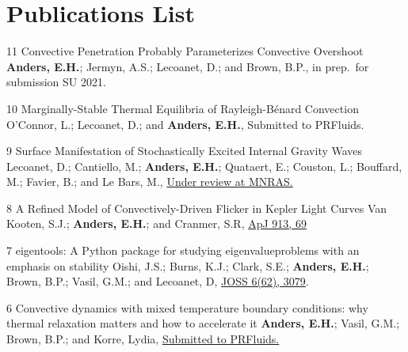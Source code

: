 \section{Publications List}

	  {11}
	  {Convective Penetration Probably Parameterizes Convective Overshoot}
	  {
		\textbf{Anders, E.H.}; Jermyn, A.S.; Lecoanet, D.; and Brown, B.P., in prep.~for submission SU 2021.
	  }

\cvpub{}
	  {10}
	  {Marginally-Stable Thermal Equilibria of Rayleigh-B\'{e}nard Convection}
	  {
		O'Connor, L.; Lecoanet, D.; and \textbf{Anders, E.H.}, Submitted to PRFluids.
	  }

\cvpub{}
	  {9}
	  {Surface Manifestation of Stochastically Excited Internal Gravity Waves}
	  {
		Lecoanet, D.; Cantiello, M.; \textbf{Anders, E.H.}; Quataert, E.; Couston, L.; Bouffard, M.; Favier, B.; and Le Bars, M.,
		  \href{https://ui.adsabs.harvard.edu/abs/2021arXiv210504558L/abstract}{Under review at MNRAS.}
	  }

\cvpub{}
	  {8}
	  {A Refined Model of Convectively-Driven Flicker in Kepler Light Curves}
	  {
		 Van Kooten, S.J.; \textbf{Anders, E.H.}; and Cranmer, S.R,
		  \href{https://iopscience.iop.org/article/10.3847/1538-4357/abf7bf}{ApJ 913, 69}
	  }

\cvpub{}
	  {7}
	  {eigentools: A Python package for studying eigenvalueproblems with an emphasis on stability}
	  {
		Oishi, J.S.; Burns, K.J.; Clark, S.E.; \textbf{Anders, E.H.}; Brown, B.P.; Vasil, G.M.; and Lecoanet, D,
		  \href{https://joss.theoj.org/papers/10.21105/joss.03079}{JOSS 6(62), 3079}.
	  }

	  {6}
	  {Convective dynamics with mixed temperature boundary conditions: why thermal relaxation matters and how to accelerate it}
	  {
		  \textbf{Anders, E.H.}; Vasil, G.M.; Brown, B.P.; and Korre, Lydia, 
		  \href{https://arxiv.org/abs/2003.00026}{Submitted to PRFluids.}
	  }

